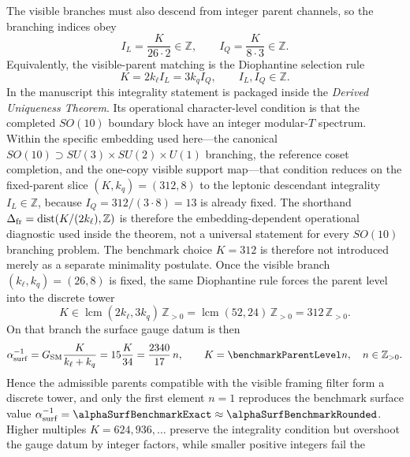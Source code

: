 \documentclass[11pt]{article}
\begin{document}
The visible branches must also descend from integer parent channels, so the branching indices obey
\begin{equation}
 I_L = \frac{K}{26\cdot2}\in\mathbb Z,
 \qquad
 I_Q = \frac{K}{8\cdot3}\in\mathbb Z.
\end{equation}
Equivalently, the visible-parent matching is the Diophantine selection rule
\begin{equation}
 K = 2k_{\ell}I_L = 3k_q I_Q,
 \qquad
 I_L,I_Q\in\mathbb Z.
 \label{eq:diophantine-selection-rule}
\end{equation}
In the manuscript this integrality statement is packaged inside the
\emph{Derived Uniqueness Theorem}. Its operational character-level condition is
that the completed $SO(10)$ boundary block have an integer modular-$T$
spectrum. Within the specific embedding used here---the canonical
$SO(10)\supset SU(3)\times SU(2)\times U(1)$ branching, the reference coset
completion, and the one-copy visible support map---that condition reduces on
the fixed-parent slice $(K,k_q)=(312,8)$ to the leptonic descendant integrality
$I_L\in\mathbb Z$, because $I_Q=312/(3\cdot8)=13$ is already fixed. The shorthand
$\Delta_{\rm fr}=\operatorname{dist}(K/(2k_{\ell}),\mathbb Z)$ is therefore the
embedding-dependent operational diagnostic used inside the theorem, not a
universal statement for every $SO(10)$ branching problem.
The benchmark choice $K=312$ is therefore not introduced merely as a separate
minimality postulate. Once the visible branch $(k_{\ell},k_q)=(26,8)$ is fixed,
the same Diophantine rule forces the parent level into the discrete tower
\begin{equation}
 K\in \operatorname{lcm}(2k_{\ell},3k_q)\,\mathbb Z_{>0}
 = \operatorname{lcm}(52,24)\,\mathbb Z_{>0}
 = 312\,\mathbb Z_{>0}.
\end{equation}
On that branch the surface gauge datum is then
\begin{equation}
 \alpha^{-1}_{\rm surf}
 = G_{\rm SM}\frac{K}{k_{\ell}+k_q}
 = 15\frac{K}{34}
 = \frac{2340}{17}\,n,
 \qquad K=\benchmarkParentLevel n,
 \quad n\in\mathbb Z_{>0}.
\end{equation}
Hence the admissible parents compatible with the visible framing filter form a
discrete tower, and only the first element $n=1$ reproduces the benchmark
surface value $\alpha^{-1}_{\rm surf}=\alphaSurfBenchmarkExact\approx\alphaSurfBenchmarkRounded$. Higher multiples
$K=624,936,\ldots$ preserve the integrality condition but overshoot the gauge
datum by integer factors, while smaller positive integers fail the
\end{document}
